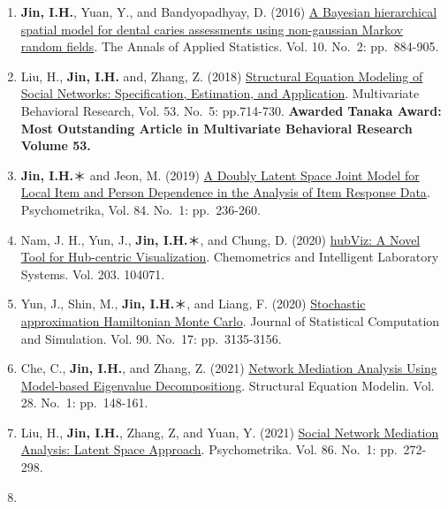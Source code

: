 \documentclass[
]{book}
\begin{document}
\begin{enumerate}
\item
  \textbf{Jin, I.H.}, Yuan, Y., and Bandyopadhyay, D. (2016) \href{https://www.researchgate.net/publication/305627921_A_Bayesian_hierarchical_spatial_model_for_dental_caries_assessment_using_non-Gaussian_Markov_random_fields}{A Bayesian hierarchical spatial model for dental caries assessments using non-gaussian Markov random fields}. The Annals of Applied Statistics. Vol. 10. No.~2: pp.~884-905.
\item
  Liu, H., \textbf{Jin, I.H.} and, Zhang, Z. (2018) \href{https://www.researchgate.net/publication/329215082_Structural_Equation_Modeling_of_Social_Networks_Specification_Estimation_and_Application}{Structural Equation Modeling of Social Networks: Specification, Estimation, and Application}. Multivariate Behavioral Research, Vol. 53. No.~5: pp.714-730. \textbf{Awarded Tanaka Award: Most Outstanding Article in Multivariate Behavioral Research Volume 53.}
\item
  \textbf{Jin, I.H.}＊ and Jeon, M. (2019) \href{https://www.researchgate.net/publication/326276196_A_Doubly_Latent_Space_Joint_Model_for_Local_Item_and_Person_Dependence_in_the_Analysis_of_Item_Response_Data}{A Doubly Latent Space Joint Model for Local Item and Person Dependence in the Analysis of Item Response Data}. Psychometrika, Vol. 84. No.~1: pp.~236-260.
\item
  Nam, J. H., Yun, J., \textbf{Jin, I.H.}＊, and Chung, D. (2020) \href{https://www.researchgate.net/publication/341850019_hubViz_A_Novel_Tool_for_Hub-centric_Visualization}{hubViz: A Novel Tool for Hub-centric Visualization}. Chemometrics and Intelligent Laboratory Systems. Vol. 203. 104071.
\item
  Yun, J., Shin, M., \textbf{Jin, I.H.}＊, and Liang, F. (2020) \href{https://arxiv.org/abs/1810.04811}{Stochastic approximation Hamiltonian Monte Carlo}. Journal of Statistical Computation and Simulation. Vol. 90. No.~17: pp.~3135-3156.
\item
  Che, C., \textbf{Jin, I.H.}, and Zhang, Z. (2021) \href{https://www.researchgate.net/publication/339371541_Network_Mediation_Analysis_Using_Model-Based_Eigenvalue_Decomposition}{Network Mediation Analysis Using Model-based Eigenvalue Decompositiong}. Structural Equation Modelin. Vol. 28. No.~1: pp.~148-161.
\item
  Liu, H., \textbf{Jin, I.H.}, Zhang, Z, and Yuan, Y. (2021) \href{https://arxiv.org/abs/1810.03751}{Social Network Mediation Analysis: Latent Space Approach}. Psychometrika. Vol. 86. No.~1: pp.~272-298.
\item

\end{enumerate}
\end{document}
